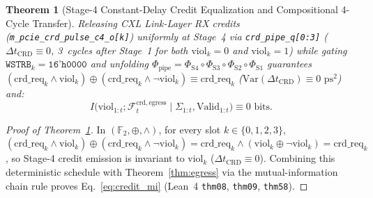 \documentclass[11pt,letterpaper]{article}
\theoremstyle{spectralthm}
\newtheorem{theorem}{Theorem}[section]
\begin{document}
\begin{theorem}[Stage-4 Constant-Delay Credit Equalization and Compositional 4-Cycle Transfer]
\label{thm:credit}
\label{thm:pipeline_comp}
Releasing CXL Link-Layer RX credits (\texttt{m\_pcie\_crd\_pulse\_c4\_o[k]}) uniformly at Stage~4 via \texttt{crd\_pipe\_q[0:3]} ($\Delta t_{\mathrm{CRD}} \equiv 0$, 3~cycles after Stage~1 for both $\mathrm{viol}_k = 0$ and $\mathrm{viol}_k = 1$) while gating $\texttt{WSTRB}_k = \texttt{16'h0000}$ and unfolding $\Phi_{\mathrm{pipe}} = \Phi_{\mathrm{S4}} \circ \Phi_{\mathrm{S3}} \circ \Phi_{\mathrm{S2}} \circ \Phi_{\mathrm{S1}}$ guarantees $(\mathrm{crd\_req}_k \wedge \mathrm{viol}_k) \oplus (\mathrm{crd\_req}_k \wedge \neg\mathrm{viol}_k) \equiv \mathrm{crd\_req}_k$ ($\mathrm{Var}(\Delta t_{\mathrm{CRD}}) \equiv 0\text{~ps}^2$) and:
\begin{equation}
\label{eq:credit_mi}
I\bigl(\mathrm{viol}_{1:t}; \mathcal{F}_t^{\mathrm{crd,egress}} \;\big|\; \Sigma_{1:t}, \mathrm{Valid}_{1:t}\bigr) \equiv 0\text{~bits}.
\end{equation}
\end{theorem}
\begin{proof}[Proof of Theorem~\ref{thm:credit}]
In $(\mathbb{F}_2, \oplus, \wedge)$, for every slot $k \in \{0,1,2,3\}$, $(\mathrm{crd\_req}_k \wedge \mathrm{viol}_k) \oplus (\mathrm{crd\_req}_k \wedge \neg\mathrm{viol}_k) = \mathrm{crd\_req}_k \wedge (\mathrm{viol}_k \oplus \neg\mathrm{viol}_k) = \mathrm{crd\_req}_k$, so Stage-4 credit emission is invariant to $\mathrm{viol}_k$ ($\Delta t_{\mathrm{CRD}} \equiv 0$). Combining this deterministic schedule with Theorem~\ref{thm:egress} via the mutual-information chain rule proves Eq.~\eqref{eq:credit_mi} (Lean~4 \texttt{thm08}, \texttt{thm09}, \texttt{thm58}).
\end{proof}
\end{document}
